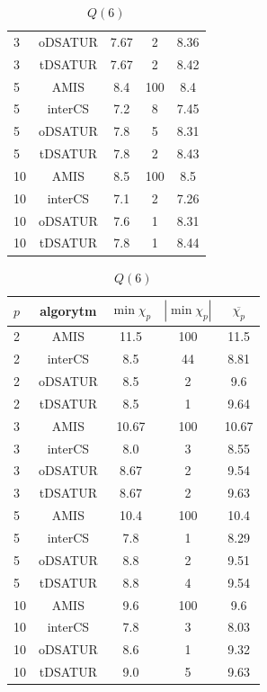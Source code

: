 \documentclass[10pt,a4paper]{article}
\begin{document}
\begin{table}[H]
\begin{minipage}{.5\linewidth}
\begin{tabular}{|l|c|c|c|c|}
				3 & oDSATUR & 7.67 & 2 & 8.36 \\
				3 & tDSATUR & 7.67 & 2 & 8.42 \\
				\hline
				5 & AMIS & 8.4 & 100 & 8.4 \\
				5 & interCS & 7.2 & 8 & 7.45 \\
				5 & oDSATUR & 7.8 & 5 & 8.31 \\
				5 & tDSATUR & 7.8 & 2 & 8.43 \\
				\hline
				10 & AMIS & 8.5 & 100 & 8.5 \\
				10 & interCS & 7.1 & 2 & 7.26 \\
				10 & oDSATUR & 7.6 & 1 & 8.31 \\
				10 & tDSATUR & 7.8 & 1 & 8.44 \\
				\hline
			\end{tabular}
			\caption{$Q(6)$}
		\end{minipage}
		\begin{minipage}{.5\linewidth}
			\centering
			\begin{tabular}{|l|c|c|c|c|}
				\hline
				\textbf{$p$} & \textbf{algorytm} & \textbf{$\min \chi_{p}$} & \textbf{$|\min \chi_{p}|$} & \textbf{$\overline{\chi_{p}}$} \\
				\hline
				2 & AMIS & 11.5 & 100 & 11.5 \\
				2 & interCS & 8.5 & 44 & 8.81 \\
				2 & oDSATUR & 8.5 & 2 & 9.6 \\
				2 & tDSATUR & 8.5 & 1 & 9.64 \\
				\hline
				3 & AMIS & 10.67 & 100 & 10.67 \\
				3 & interCS & 8.0 & 3 & 8.55 \\
				3 & oDSATUR & 8.67 & 2 & 9.54 \\
				3 & tDSATUR & 8.67 & 2 & 9.63 \\
				\hline
				5 & AMIS & 10.4 & 100 & 10.4 \\
				5 & interCS & 7.8 & 1 & 8.29 \\
				5 & oDSATUR & 8.8 & 2 & 9.51 \\
				5 & tDSATUR & 8.8 & 4 & 9.54 \\
				\hline
				10 & AMIS & 9.6 & 100 & 9.6 \\
				10 & interCS & 7.8 & 3 & 8.03 \\
				10 & oDSATUR & 8.6 & 1 & 9.32 \\
				10 & tDSATUR & 9.0 & 5 & 9.63 \\
				\hline
			\end{tabular}

\end{minipage}
\end{table}
\end{document}
